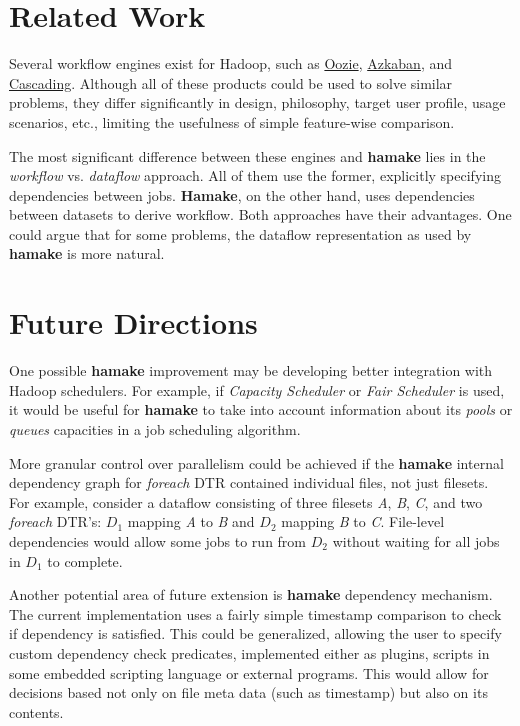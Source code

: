 \documentclass[10pt,conference,letterpaper]{IEEEtran}
\begin{document}
\section{Related Work}

Several workflow engines exist for Hadoop, such as
\href{http://github.com/tucu00/oozie1}{Oozie},
\href{http://sna-projects.com/azkaban/}{Azkaban}, and
\href{http://www.cascading.org/}{Cascading}.  Although all of these
products could be used to solve similar problems, they differ
significantly in design, philosophy, target user profile, usage
scenarios, etc., limiting the usefulness of simple feature-wise
comparison.

The most significant difference between these engines and \textbf{hamake}
lies in the \textit{workflow} vs. \textit{dataflow} approach. All of them
use the former, explicitly specifying dependencies between
jobs. \textbf{Hamake}, on the other hand, uses dependencies between datasets
to derive workflow. Both approaches have their advantages. One
could argue that for some problems, the dataflow representation as used by
\textbf{hamake} is more natural.

\section{Future Directions}

One possible \textbf{hamake} improvement may be developing better integration with
Hadoop schedulers. For example, if \textit{Capacity Scheduler} or
\textit{Fair Scheduler} is used, it would be useful for \textbf{hamake} to take into account
information about its \textit{pools} or \textit{queues} capacities in a
job scheduling algorithm.

More granular control over parallelism could be achieved if the
\textbf{hamake} internal dependency graph for \emph{foreach} DTR
contained individual files, not just filesets. For example, consider a
dataflow consisting of three filesets \textit{A}, \textit{B},
\textit{C}, and two \emph{foreach} DTR's: \textit{$D_1$} mapping
\textit{A} to \textit{B} and \textit{$D_2$} mapping \textit{B} to
\textit{C}. File-level dependencies would allow some jobs to run from
\textit{$D_2$} without waiting for all jobs in \textit{$D_1$} to
complete.

Another potential area of future extension is \textbf{hamake} dependency
mechanism. The current implementation uses a fairly simple timestamp
comparison to check if dependency is satisfied. This could be
generalized, allowing the user to specify custom dependency check
predicates, implemented either as plugins, scripts in some embedded
scripting language or external programs. This would allow for
decisions based not only on file meta data (such as timestamp) but
also on its contents.
\end{document}
